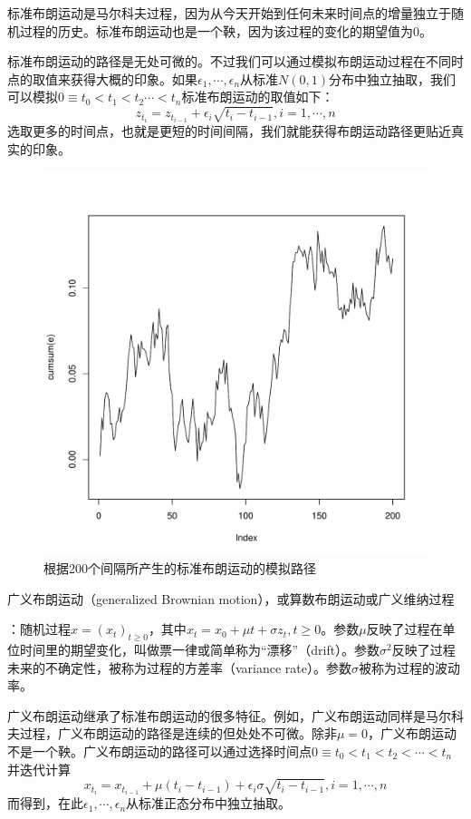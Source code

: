 \documentclass[UTF8]{ctexart}
\newcommand \qd[1] {\begin{qds} {#1} \end{qds}}
\begin{document}
标准布朗运动是马尔科夫过程，因为从今天开始到任何未来时间点的增量独立于随机过程的历史。标准布朗运动也是一个鞅，因为该过程的变化的期望值为0。

标准布朗运动的路径是无处可微的。不过我们可以通过模拟布朗运动过程在不同时点的取值来获得大概的印象。如果$\epsilon_1,\cdots,\epsilon_n$从标准$N(0,1)$分布中独立抽取，我们可以模拟$0 \equiv t_0 <t_1 <t_2 \cdots <t_n$标准布朗运动的取值如下：
$$z_{t_i}=z_{t_{i-1}}+\epsilon_i \sqrt{t_i-t_{i-1}},i=1,\cdots,n$$
选取更多的时间点，也就是更短的时间间隔，我们就能获得布朗运动路径更贴近真实的印象。

\begin{figure}[H]
    \centering
    \includegraphics[scale=0.6]{P41.pdf}
    \caption*{根据200个间隔所产生的标准布朗运动的模拟路径}
    \label{fig:BrownMotion1}
\end{figure}

\qd{广义布朗运动（generalized Brownian motion），或算数布朗运动或广义维纳过程}：随机过程$x=(x_t)_{t \geqslant 0}$，其中$x_t=x_0+\mu t +\sigma z_t,t \geqslant 0$。参数$\mu$反映了过程在单位时间里的期望变化，叫做票一律或简单称为“漂移”（drift）。参数$\sigma^2$反映了过程未来的不确定性，被称为过程的方差率（variance rate）。参数$\sigma$被称为过程的波动率。

广义布朗运动继承了标准布朗运动的很多特征。例如，广义布朗运动同样是马尔科夫过程，广义布朗运动的路径是连续的但处处不可微。除非$\mu=0$，广义布朗运动不是一个鞅。广义布朗运动的路径可以通过选择时间点$0 \equiv t_0 <t_1 <t_2< \cdots <t_n$并迭代计算
$$x_{t_i}=x_{t_{i-1}}+\mu(t_i-t_{i-1})+\epsilon_i \sigma \sqrt{t_i-t_{i-1}},i=1,\cdots,n$$
而得到，在此$\epsilon_1,\cdots,\epsilon_n$从标准正态分布中独立抽取。
\end{document}
